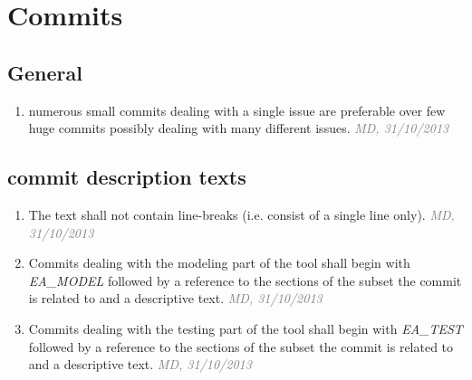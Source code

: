 \documentclass[a4paper, oneside]{scrreprt}
\let\emph\textsl
\newcommand{\ruleauthor}[2]{\mbox{}\newline\mbox{}\hfill{\footnotesize\textcolor{gray}{\emph{#1, #2}}}\xspace}
\begin{document}
\section{Commits}
\subsection{General}
\begin{enumerate}
\item numerous small commits dealing with a single issue are preferable over few huge commits possibly dealing with many different issues. \ruleauthor{MD}{31/10/2013}
\end{enumerate}

\subsection{commit description texts}
\begin{enumerate}
\item The text shall not contain line-breaks (i.e. consist of a single line only). \ruleauthor{MD}{31/10/2013}
\item Commits dealing with the modeling part of the tool shall begin with \emph{EA\_MODEL} followed by a reference to the sections of the subset the commit is related to and a descriptive text. \ruleauthor{MD}{31/10/2013}
\item Commits dealing with the testing part of the tool shall begin with \emph{EA\_TEST} followed by a reference to the sections of the subset the commit is related to and a descriptive text. \ruleauthor{MD}{31/10/2013}
\end{enumerate}
\end{document}
